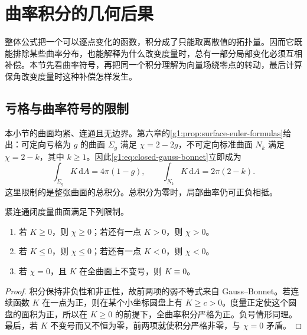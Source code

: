 
% 
% 
% 

\section{曲率积分的几何后果}
\label{g1:sec:0905}

整体公式把一个可以逐点变化的函数，积分成了只能取离散值的拓扑量。因而它既能排除某些曲率分布，也能解释为什么改变度量时，总有一部分局部变化必须互相补偿。本节先看曲率符号，再把同一个积分理解为向量场绕零点的转动，最后计算保角改变度量时这种补偿怎样发生。

\subsection{亏格与曲率符号的限制}
\label{g1:subsec:0905:01}

本小节的曲面均紧、连通且无边界。第六章的\cref{g1:prop:surface-euler-formulas}给出：可定向亏格为 \(g\) 的曲面 \(\Sigma_g\) 满足 \(\chi=2-2g\)，不可定向标准曲面 \(N_k\) 满足 \(\chi=2-k\)，其中 \(k\ge1\)。因此\eqref{g1:eq:closed-gauss-bonnet}立即成为
\begin{equation}
	\label{g1:eq:total-curvature-genus}
	\int_{\Sigma_g}K\,\mathrm{d}A=4\pi(1-g),\qquad
	\int_{N_k}K\,\mathrm{d}A=2\pi(2-k).
\end{equation}
这里限制的是整张曲面的总积分。总积分为零时，局部曲率仍可正负相抵。

\begin{proposition}
	\label{g1:prop:curvature-sign-topology}
	紧连通闭度量曲面满足下列限制。
	\begin{enumerate}
		\item 若 \(K\ge0\)，则 \(\chi\ge0\)；若还有一点 \(K>0\)，则 \(\chi>0\)。
		\item 若 \(K\le0\)，则 \(\chi\le0\)；若还有一点 \(K<0\)，则 \(\chi<0\)。
		\item 若 \(\chi=0\)，且 \(K\) 在全曲面上不变号，则 \(K\equiv0\)。
	\end{enumerate}
\end{proposition}
\begin{proof}
	积分保持非负性和非正性，故前两项的弱不等式来自 Gauss--Bonnet。若连续函数 \(K\) 在一点为正，则在某个小坐标圆盘上有 \(K\ge c>0\)。度量正定使这个圆盘的面积为正，所以在 \(K\ge0\) 的前提下，全曲率积分严格为正。负号情形同理。最后，若 \(K\) 不变号而又不恒为零，前两项就使积分严格非零，与 \(\chi=0\) 矛盾。
\end{proof}

